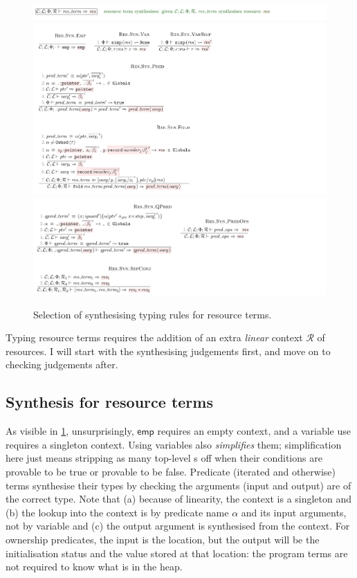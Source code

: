 \begin{figure}[tp]
    \includegraphics{figures/kernel-res-term-synth-1}
    \includegraphics{figures/kernel-res-term-synth-2}
    \includegraphics{figures/kernel-res-term-synth-3}
    \caption{Selection of  synthesising typing rules for resource
        terms.}\label{fig:typing-res-term-synth}
\end{figure}

Typing resource terms requires the addition of an extra \emph{linear} context
$\mathcal{R}$ of resources. I will start with the synthesising judgements first,
and move on to checking judgements after.

\subsection{Synthesis for resource terms}\label{subsec:synth-res-term}

As visible in \cref{fig:typing-res-term-synth}, unsurprisingly, $\mathsf{emp}$
requires an empty context, and a variable use requires a singleton context.
Using variables also \emph{simplifies} them; simplification here just means
stripping as many top-level s off when their conditions are
provable to be true or provable to be false. Predicate (iterated and otherwise)
terms synthesise their types by checking the arguments (input and output) are
of the correct type. Note that (a) because of linearity, the context is a
singleton and (b) the lookup into the context is by predicate name $\alpha$ and
its input arguments, not by variable and (c) the output argument is synthesised
from the context. For ownership predicates, the input is the location, but the
output will be the initialisation status and the value stored at that location:
the program terms are not required to know what is in the heap.

